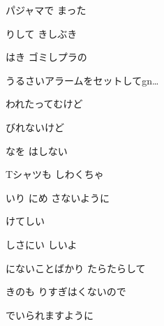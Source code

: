 \documentclass[a4paper,tate,twocolumn,12pt]{ltjtarticle}
\begin{document}
\begin{flushleft}
\vspace{2em}

\noindent\begin{minipage}{\linewidth}
パジャマで まった

りして きしぶき

はき ゴミしプラの

うるさいアラームをセットしてgn…
\end{minipage}

\vspace{2em}

\noindent\begin{minipage}{\linewidth}
われたってむけど

びれないけど

なを はしない

Tシャツも しわくちゃ

いり にめ さないように

けてしい 

しさにい しいよ

にないことばかり たらたらして

きのも りすぎはくないので

でいられますように
\end{minipage}

\end{flushleft}
\end{document}
